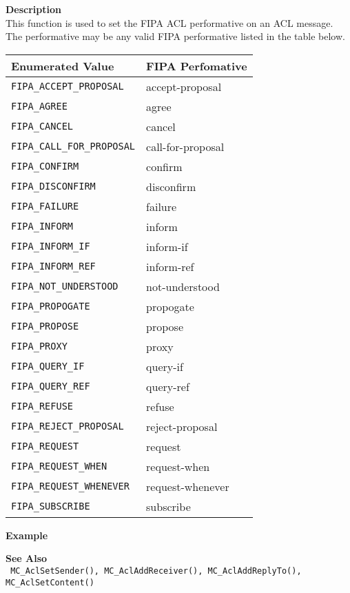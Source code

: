 \noindent
{\bf Description}\\
This function is used to set the FIPA ACL performative on an ACL message. 
The performative may be any valid FIPA performative listed in the table 
below. \\
\begin{tabular}{ll}
Enumerated Value & FIPA Perfomative \\ \hline
\texttt{FIPA\_ACCEPT\_PROPOSAL} & accept-proposal \\
\texttt{FIPA\_AGREE} & agree \\
\texttt{FIPA\_CANCEL} & cancel\\
\texttt{FIPA\_CALL\_FOR\_PROPOSAL} & call-for-proposal \\
\texttt{FIPA\_CONFIRM} & confirm\\
\texttt{FIPA\_DISCONFIRM} & disconfirm \\
\texttt{FIPA\_FAILURE} & failure \\
\texttt{FIPA\_INFORM} & inform \\
\texttt{FIPA\_INFORM\_IF} & inform-if \\
\texttt{FIPA\_INFORM\_REF} & inform-ref \\
\texttt{FIPA\_NOT\_UNDERSTOOD} & not-understood \\
\texttt{FIPA\_PROPOGATE} & propogate \\
\texttt{FIPA\_PROPOSE} & propose \\
\texttt{FIPA\_PROXY} & proxy \\
\texttt{FIPA\_QUERY\_IF} & query-if \\
\texttt{FIPA\_QUERY\_REF} & query-ref \\
\texttt{FIPA\_REFUSE} & refuse \\
\texttt{FIPA\_REJECT\_PROPOSAL} & reject-proposal \\
\texttt{FIPA\_REQUEST} & request \\
\texttt{FIPA\_REQUEST\_WHEN} & request-when \\
\texttt{FIPA\_REQUEST\_WHENEVER} & request-whenever \\
\texttt{FIPA\_SUBSCRIBE} & subscribe
\end{tabular}


\noindent
{\bf Example}\\
\noindent
{\footnotesize}

\noindent
{\bf See Also}\\
\texttt{
  MC\_AclSetSender(), MC\_AclAddReceiver(), MC\_AclAddReplyTo(), \linebreak 
    MC\_AclSetContent()
}

